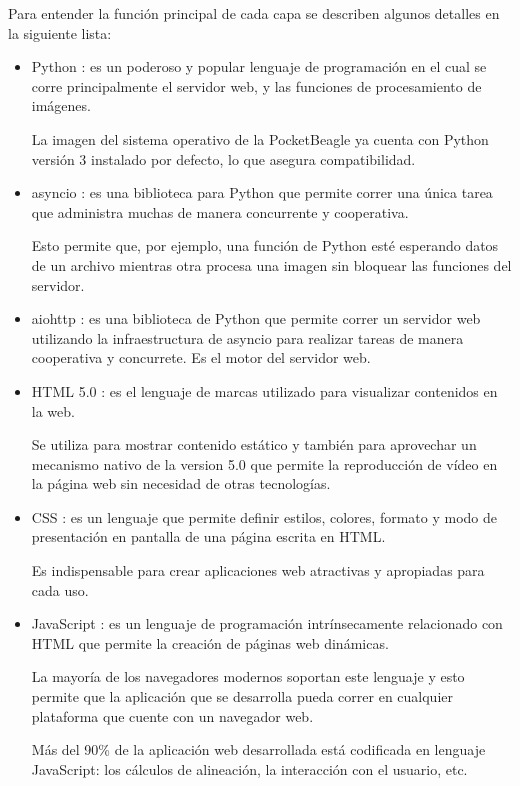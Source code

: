    Para entender la función principal de cada capa se describen algunos detalles en la siguiente lista:
   \begin{itemize}
      \item{Python \citep{WEBSITE:python}: es un poderoso y popular lenguaje de programación en el cual se corre principalmente el servidor web, y las funciones de procesamiento de imágenes.\par
         La imagen del sistema operativo de la PocketBeagle ya cuenta con Python versión 3 instalado por defecto, lo que asegura compatibilidad.
      }
      \item{asyncio \citep{WEBSITE:asyncio}: es una biblioteca para Python que permite correr una única tarea que administra muchas de manera concurrente y cooperativa.\par
      Esto permite que, por ejemplo, una función de Python esté esperando datos de un archivo mientras otra procesa una imagen sin bloquear las funciones del servidor.
      }
      \item{aiohttp \citep{WEBSITE:aiohttp}: es una biblioteca de Python que permite correr un servidor web utilizando la infraestructura de asyncio para realizar tareas de manera cooperativa y concurrete.
      Es el motor del servidor web.
      }
      \item{HTML 5.0 \citep{WEBSITE:html5}: es el lenguaje de marcas utilizado para visualizar contenidos en la web.\par
         Se utiliza para mostrar contenido estático y también para aprovechar un mecanismo nativo de la version 5.0 que permite la reproducción de vídeo en la página web sin necesidad de otras tecnologías.
      }
      \item{CSS \citep{WEBSITE:css}: es un lenguaje que permite definir estilos, colores, formato y modo de presentación en pantalla de una página escrita en HTML.\par
      Es indispensable para crear aplicaciones web atractivas y apropiadas para cada uso.
      }
      \item{JavaScript \citep{WEBSITE:javascript}: es un lenguaje de programación intrínsecamente relacionado con HTML que permite la creación de páginas web dinámicas.\par
         La mayoría de los navegadores modernos soportan este lenguaje y esto permite que la aplicación que se desarrolla pueda correr en cualquier plataforma que cuente con un navegador web.\par
         Más del 90\% de la aplicación web desarrollada está codificada en lenguaje JavaScript: los cálculos de alineación, la interacción con el usuario, etc.\par
}
\end{itemize}
